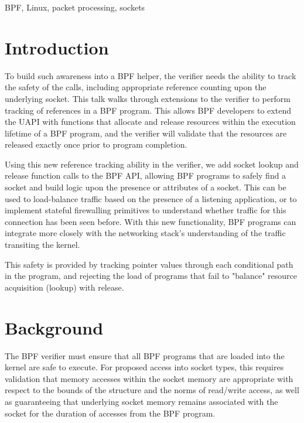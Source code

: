 \documentclass[10pt,sigconf,authorversion]{lpc}
\begin{document}
BPF, Linux, packet processing, sockets

\section{Introduction}


To build such awareness into a BPF helper, the verifier needs the ability to
track the safety of the calls, including appropriate reference counting upon
the underlying socket. This talk walks through extensions to the verifier to
perform tracking of references in a BPF program. This allows BPF developers to
extend the UAPI with functions that allocate and release resources within the
execution lifetime of a BPF program, and the verifier will validate that the
resources are released exactly once prior to program completion.

Using this new reference tracking ability in the verifier, we add socket lookup
and release function calls to the BPF API, allowing BPF programs to safely find
a socket and build logic upon the presence or attributes of a socket. This can
be used to load-balance traffic based on the presence of a listening
application, or to implement stateful firewalling primitives to understand
whether traffic for this connection has been seen before. With this new
functionality, BPF programs can integrate more closely with the networking
stack's understanding of the traffic transiting the kernel.

This safety is provided by tracking pointer values through each conditional
path in the program, and rejecting the load of programs that fail to "balance"
resource acquisition (lookup) with release.

\section{Background}

The BPF verifier must ensure that all BPF programs that are loaded into the
kernel are safe to execute. For proposed access into socket types, this
requires validation that memory accesses within the socket memory are
appropriate with respect to the bounds of the structure and the norms of
read/write access, as well as guaranteeing that underlying socket memory
remains associated with the socket for the duration of accesses from the BPF
program.
\end{document}
